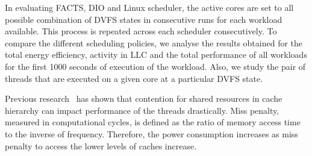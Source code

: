 In evaluating FACTS, DIO and Linux scheduler, the active cores are set to all possible
combination of DVFS states in consecutive runs for each workload available. This process
is repeated across each scheduler consecutively. To compare the different scheduling
policies, we analyse the results obtained for the total energy efficiency, activity in LLC
and the total performance of all workloads for the \textsf{first 1000 seconds} of
execution of the workload. Also, we study the pair of threads that are executed on a given
core at a particular DVFS state. 


Previous research~\citep{Nishtala:2013:ETC:2555754.2555775,
Zhuravlev:2013:SES:2498743.2498946,Blagodurov:2010:CSM:1880018.1880019,
Zhuravlev:2012:SST:2379776.2379780, Becchi:2006:DTA:1128022.1128029} has shown that
contention for shared resources in cache hierarchy can impact performance of the threads
drastically. Miss penalty, measured in computational cycles, is defined as the ratio of
memory access time to the inverse of frequency. Therefore, the power consumption increases
as miss penalty to access the lower levels of caches increase.  

